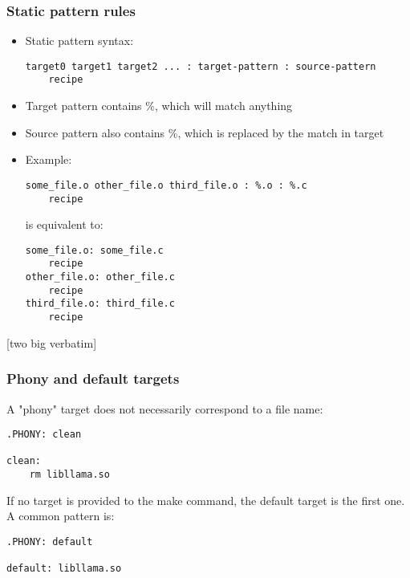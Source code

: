 \documentclass[12pt]{article}
\begin{document}
\subsubsection{Static pattern rules}
\begin{itemize}
    \item Static pattern syntax:
    \begin{verbatim}
target0 target1 target2 ... : target-pattern : source-pattern
    recipe
    \end{verbatim}
    
    \item Target pattern contains \%, which will match anything
    \item Source pattern also contains \%, which is replaced by the match in target
    \item Example:
    \begin{verbatim}
some_file.o other_file.o third_file.o : %.o : %.c
    recipe
    \end{verbatim}
    is equivalent to:
    \begin{verbatim}
some_file.o: some_file.c
    recipe
other_file.o: other_file.c
    recipe
third_file.o: third_file.c
    recipe
    \end{verbatim}
\end{itemize}
[two big verbatim]

\subsubsection{Phony and default targets}

A "phony" target does not necessarily correspond to a file name:

\begin{verbatim}
.PHONY: clean

clean:
    rm libllama.so
\end{verbatim}

If no target is provided to the make command, the default target is the first one. A common pattern is:

\begin{verbatim}
.PHONY: default

default: libllama.so
\end{verbatim}
\end{document}
